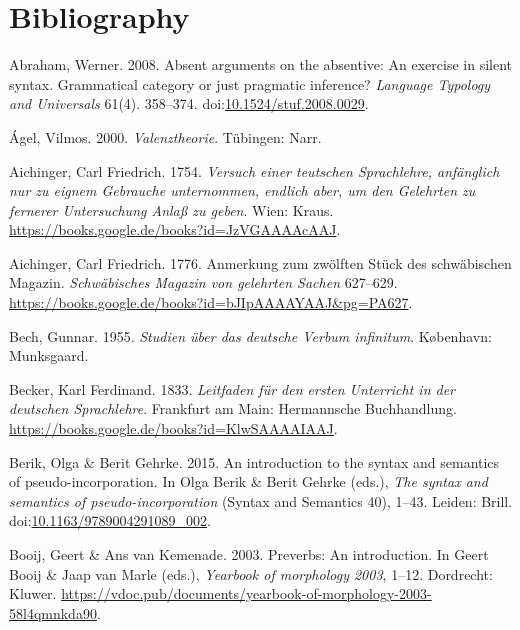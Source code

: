 \hypertarget{bibliography}{%
\chapter*{Bibliography}\label{bibliography}}

\leavevmode{}%
Abraham, Werner. 2008. Absent arguments on the absentive: An exercise in
silent syntax. Grammatical category or just pragmatic inference?
\emph{Language Typology and Universals} 61(4). 358--374.
doi:\href{https://doi.org/10.1524/stuf.2008.0029}{10.1524/stuf.2008.0029}.

\leavevmode{}%
Ágel, Vilmos. 2000. \emph{Valenztheorie}. Tübingen: Narr.

\leavevmode{}%
Aichinger, Carl Friedrich. 1754. \emph{Versuch einer teutschen
{Sprachlehre}, anfänglich nur zu eignem {Gebrauche} unternommen, endlich
aber, um den {Gelehrten} zu fernerer {Untersuchung} {Anlaß} zu geben}.
Wien: Kraus. \url{https://books.google.de/books?id=JzVGAAAAcAAJ}.

\leavevmode{}%
Aichinger, Carl Friedrich. 1776. Anmerkung zum zwölften {Stück} des
schwäbischen {Magazin}. \emph{Schwäbisches {Magazin} von gelehrten
{Sachen}} 627--629.
\url{https://books.google.de/books?id=bJIpAAAAYAAJ\&pg=PA627}.

\leavevmode{}%
Bech, Gunnar. 1955. \emph{Studien über das deutsche {Verbum} infinitum}.
København: Munksgaard.

\leavevmode{}%
Becker, Karl Ferdinand. 1833. \emph{Leitfaden für den ersten
{Unterricht} in der deutschen {Sprachlehre}}. Frankfurt am Main:
Hermannsche Buchhandlung.
\url{https://books.google.de/books?id=KlwSAAAAIAAJ}.

\leavevmode{}%
Berik, Olga \& Berit Gehrke. 2015. An introduction to the syntax and
semantics of pseudo-incorporation. In Olga Berik \& Berit Gehrke (eds.),
\emph{The syntax and semantics of pseudo-incorporation} (Syntax and
Semantics 40), 1--43. Leiden: Brill.
doi:\href{https://doi.org/10.1163/9789004291089_002}{10.1163/9789004291089\_002}.

\leavevmode{}%
Booij, Geert \& Ans van Kemenade. 2003. Preverbs: An introduction. In
Geert Booij \& Jaap van Marle (eds.), \emph{Yearbook of morphology
2003}, 1--12. Dordrecht: Kluwer.
\url{https://vdoc.pub/documents/yearbook-of-morphology-2003-58l4qmnkda90}.

